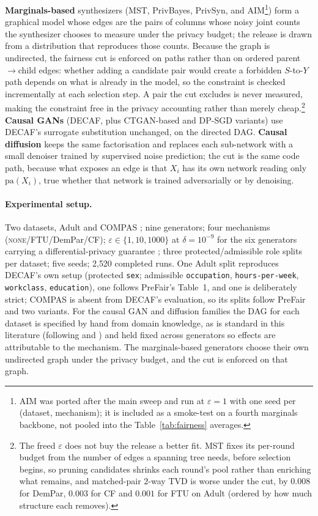 \documentclass{article}
\begin{document}
\textbf{Marginals-based} synthesizers (MST, PrivBayes, PrivSyn, and
AIM\footnote{AIM \citep{mckenna2022aim} was ported after the main sweep and
run at $\varepsilon{=}1$ with one seed per (dataset, mechanism); it is
included as a smoke-test on a fourth marginals backbone, not pooled into the
Table~\ref{tab:fairness} averages.}) form a
graphical model whose edges are the pairs of columns whose noisy joint counts
the synthesizer chooses to measure under the privacy budget; the release is
drawn from a distribution that reproduces those counts. Because the graph is
undirected, the fairness cut is enforced on paths rather than on ordered
parent$\rightarrow$child edges: whether adding a candidate pair would create
a forbidden $S$-to-$Y$ path depends on what is already in the model, so the
constraint is checked incrementally at each selection step. A pair the cut
excludes is never measured, making the constraint free in the privacy
accounting rather than merely cheap.\footnote{The freed $\varepsilon$ does
not buy the release a better fit. MST fixes its per-round budget from the
number of edges a spanning tree needs, before selection begins, so pruning
candidates shrinks each round's pool rather than enriching what remains, and
matched-pair $2$-way TVD is worse under the cut, by $0.008$ for DemPar,
$0.003$ for CF and $0.001$ for FTU on Adult (ordered by how much structure
each removes).} \textbf{Causal GANs} (DECAF, plus CTGAN-based
\citep{xu2019ctgan} and DP-SGD \citep{abadi2016dpsgd} variants) use DECAF's
surrogate substitution unchanged, on the directed DAG. \textbf{Causal
diffusion} keeps the same factorisation and replaces each sub-network with a
small denoiser trained by supervised noise prediction; the cut is the same
code path, because what exposes an edge is that $X_i$ has its own network
reading only $\mathrm{pa}(X_i)$, true whether that network is trained
adversarially or by denoising.

\paragraph{Experimental setup.}
Two datasets, Adult \citep{becker1996adult} and COMPAS
\citep{angwin2016machinebias}; nine generators; four mechanisms
(\textsc{none}/FTU/DemPar/CF); $\varepsilon \in \{1,10,1000\}$ at $\delta =
10^{-9}$ for the six generators carrying a differential-privacy guarantee
\citep{dwork2006calibrating}; three protected/admissible role splits per
dataset; five seeds; 2{,}520 completed runs. One Adult split reproduces
DECAF's own setup (protected \texttt{sex}; admissible \texttt{occupation},
\texttt{hours-per-week}, \texttt{workclass}, \texttt{education}), one
follows PreFair's Table~1, and one is deliberately strict; COMPAS is absent
from DECAF's evaluation, so its splits follow PreFair and two variants. For
the causal GAN and diffusion families the DAG for each dataset is specified
by hand from domain knowledge, as is standard in this literature (following
\citet{kusner2017counterfactual} and \citet{zhang2017causalframework}) and
held fixed across generators so effects are attributable to the mechanism.
The marginals-based generators choose their own undirected graph under the
privacy budget, and the cut is enforced on that graph.
\end{document}
